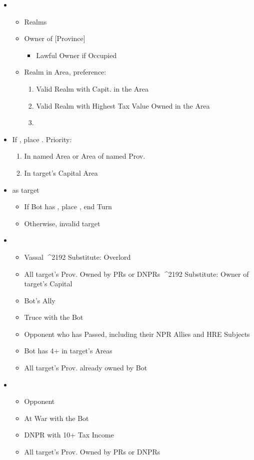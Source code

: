 \documentclass[10pt]{article}
\begin{document}
\begin{itemize}
	\item {}
	\begin{itemize}
		\item Realms
		\item \dprime Owner of [Province]\dprime
		\begin{itemize}
			\item Lawful Owner if Occupied
		\end{itemize}
		\item \dprime Realm in Area\dprime, preference:
		\begin{enumerate}
			\item Valid Realm with Capit. in the Area
			\item Valid Realm with Highest Tax Value Owned in the Area
			\item \az
		\end{enumerate}
	\end{itemize}
	\item If , place \claim. Priority:
	\begin{enumerate}
		\item In named Area or Area of named Prov.
		\item In target's Capital Area
	\end{enumerate}
	\item {} as target
	\begin{itemize}
		\item If Bot has , place \claim, end Turn
		\item Otherwise, invalid target
	\end{itemize}
	\item {}
	\begin{itemize}
		\item Vassal ^^^^2192 Substitute: Overlord
		\item All target's Prov. Owned by PRs or DNPRs ^^^^2192 Substitute: Owner of target's Capital
		\item Bot's Ally
		\item Truce with the Bot
		\item Opponent who has Passed, including their NPR Allies and HRE Subjects 
		\item Bot has 4+ \influence in target's Areas
		\item All target's Prov. already owned by Bot
	\end{itemize}
	\item {}
	\begin{itemize}
		\item Opponent
		\item At War with the Bot
		\item DNPR with 10+ Tax Income
		\item All target's Prov. Owned by PRs or DNPRs
	\end{itemize}
\end{itemize}
\end{document}
